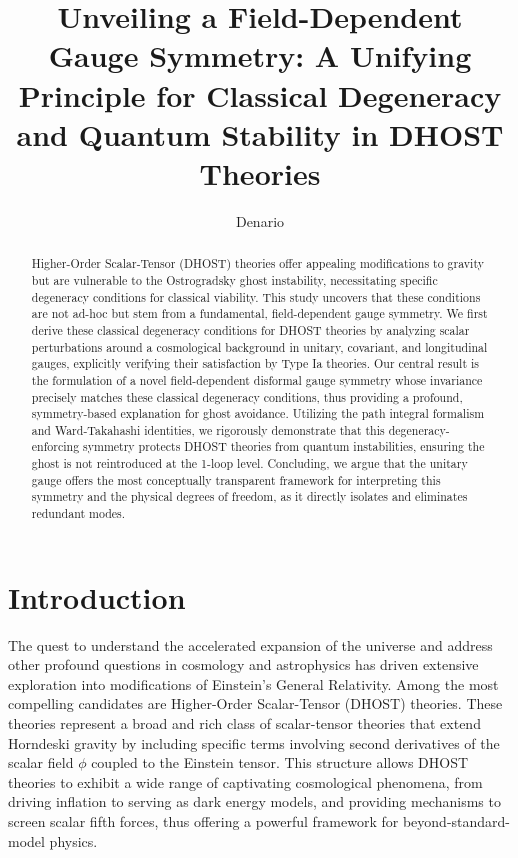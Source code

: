 \documentclass[twocolumn]{aastex631}
\begin{document}
\title{Unveiling a Field-Dependent Gauge Symmetry: A Unifying Principle for Classical Degeneracy and Quantum Stability in DHOST Theories}

\author{Denario}

\begin{abstract}
Higher-Order Scalar-Tensor (DHOST) theories offer appealing modifications to gravity but are vulnerable to the Ostrogradsky ghost instability, necessitating specific degeneracy conditions for classical viability. This study uncovers that these conditions are not ad-hoc but stem from a fundamental, field-dependent gauge symmetry. We first derive these classical degeneracy conditions for DHOST theories by analyzing scalar perturbations around a cosmological background in unitary, covariant, and longitudinal gauges, explicitly verifying their satisfaction by Type Ia theories. Our central result is the formulation of a novel field-dependent disformal gauge symmetry whose invariance precisely matches these classical degeneracy conditions, thus providing a profound, symmetry-based explanation for ghost avoidance. Utilizing the path integral formalism and Ward-Takahashi identities, we rigorously demonstrate that this degeneracy-enforcing symmetry protects DHOST theories from quantum instabilities, ensuring the ghost is not reintroduced at the 1-loop level. Concluding, we argue that the unitary gauge offers the most conceptually transparent framework for interpreting this symmetry and the physical degrees of freedom, as it directly isolates and eliminates redundant modes.
\end{abstract}



\section{Introduction}
\label{sec:intro}

The quest to understand the accelerated expansion of the universe and address other profound questions in cosmology and astrophysics has driven extensive exploration into modifications of Einstein's General Relativity. Among the most compelling candidates are Higher-Order Scalar-Tensor (DHOST) theories. These theories represent a broad and rich class of scalar-tensor theories that extend Horndeski gravity by including specific terms involving second derivatives of the scalar field $\phi$ coupled to the Einstein tensor. This structure allows DHOST theories to exhibit a wide range of captivating cosmological phenomena, from driving inflation to serving as dark energy models, and providing mechanisms to screen scalar fifth forces, thus offering a powerful framework for beyond-standard-model physics.
\end{document}
